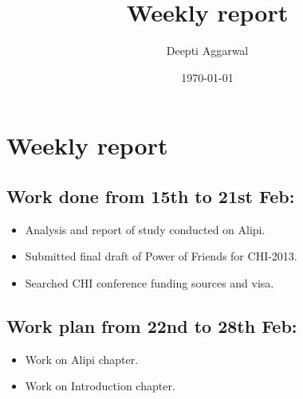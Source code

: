 \documentclass[11pt]{article}
\title{Weekly report}
\author{Deepti Aggarwal}
\date{\today}
\begin{document}
\maketitle

\setcounter{tocdepth}{3}
\vspace*{1cm}
\section{Weekly report}
\label{sec-1}

\subsection{Work done from 15th to 21st Feb:}
\label{sec-1-1}
\begin{itemize}
\item Analysis and report of study conducted on Alipi.
\item Submitted final draft of Power of Friends for CHI-2013.
\item Searched CHI conference funding sources and visa.
\end{itemize}

\subsection{Work plan from 22nd to 28th Feb:}
\label{sec-1-1}
\begin{itemize}
\item Work on Alipi chapter. 
\item Work on Introduction chapter.
\end{itemize}
\end{document}
